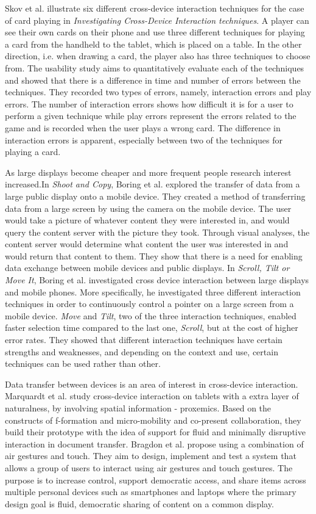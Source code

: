 Skov et al. \cite{Skov:2015} illustrate six different cross-device interaction techniques for the case of card playing in \emph{Investigating Cross-Device Interaction techniques}.
A player can see their own cards on their phone and use three different techniques for playing a card from the handheld to the tablet, which is placed on a table.
In the other direction, i.e. when drawing a card, the player also has three techniques to choose from.
The usability study aims to quantitatively evaluate each of the techniques and showed that there is a difference in time and number of errors between the techniques. 
They recorded two types of errors, namely, interaction errors and play errors.
The number of interaction errors shows how difficult it is for a user to perform a given technique while play errors represent the errors related to the game and is recorded when the user plays a wrong card.
The difference in interaction errors is apparent, especially between two of the techniques for playing a card.

As large displays become cheaper and more frequent people research interest increased.In \emph{Shoot and Copy}, Boring et al. \cite{Boring:2007} explored the transfer of data from a large public display onto a mobile device.
They created a method of transferring data from a large screen by using the camera on the mobile device.
The user would take a picture of whatever content they were interested in, and would query the content server with the picture they took.
Through visual analyses, the content server would determine what content the user was interested in and would return that content to them.
They show that there is a need for enabling data exchange between mobile devices and public displays.
In \emph{Scroll, Tilt or Move It}, Boring et al. \cite{Boring:2009} investigated cross device interaction between large displays and mobile phones.
More specifically, he investigated three different interaction techniques in order to continuously control a pointer on a large screen from a mobile device.
\emph{Move} and \emph{Tilt}, two of the three interaction techniques, enabled faster selection time compared to the last one, \emph{Scroll}, but at the cost of higher error rates.
They showed that different interaction techniques have certain strengths and weaknesses, and depending on the context and use, certain techniques can be used rather than other. 

Data transfer between devices is an area of interest in cross-device interaction.
Marquardt et al. \cite{Marquardt:2012} study cross-device interaction on tablets with a extra layer of naturalness, by involving spatial information - proxemics.
Based on the constructs of f-formation and micro-mobility and co-present collaboration, they build their prototype with the idea of support for fluid and minimally disruptive interaction in document transfer. 
Bragdon et al.\cite{Bragdon:2011} propose using a combination of air gestures and touch.
They aim to design, implement and test a system that allows a group of users to interact using air gestures and touch gestures. 
The purpose is to increase control, support democratic access, and share items across multiple personal devices such as smartphones and laptops where the primary design goal is fluid, democratic sharing of content on a common display.